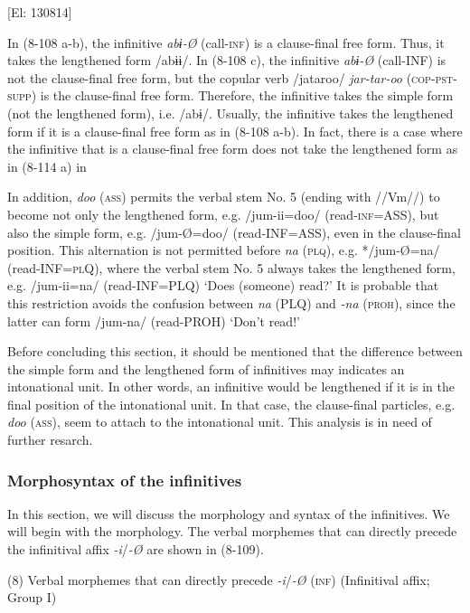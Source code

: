       [El: 130814]

In (8-108 a-b), the infinitive \textit{abɨ-Ø} (call-\textsc{inf}) is a clause-final free form. Thus, it takes the lengthened form /abɨɨ/. In (8-108 c), the infinitive \textit{abɨ-Ø} (call-INF) is not the clause-final free form, but the copular verb /jataroo/ \textit{jar-tar-oo} (\textsc{cop}-\textsc{pst}-\textsc{supp}) is the clause-final free form. Therefore, the infinitive takes the simple form (not the lengthened form), i.e. /abɨ/. Usually, the infinitive takes the lengthened form if it is a clause-final free form as in (8-108 a-b). In fact, there is a case where the infinitive that is a clause-final free form does not take the lengthened form as in (8-114 a) in 

  In addition, \textit{doo} (\textsc{ass}) permits the verbal stem No. 5 (ending with //Vm//) to become not only the lengthened form, e.g. /jum-ii=doo/ (read-\textsc{inf}=ASS), but also the simple form, e.g. /jum-Ø=doo/ (read-INF=ASS), even in the clause-final position. This alternation is not permitted before \textit{na} (\textsc{plq}), e.g. */jum-Ø=na/ (read-INF=\textsc{pl}Q), where the verbal stem No. 5 always takes the lengthened form, e.g. /jum-ii=na/ (read-INF=PLQ) ‘Does (someone) read?’ It is probable that this restriction avoids the confusion between \textit{na} (PLQ) and \textit{{}-na} (\textsc{proh}), since the latter can form /jum-na/ (read-PROH) ‘Don’t read!’

  Before concluding this section, it should be mentioned that the difference between the simple form and the lengthened form of infinitives may indicates an intonational unit. In other words, an infinitive would be lengthened if it is in the final position of the intonational unit. In that case, the clause-final particles, e.g. \textit{doo} (\textsc{ass}), seem to attach to the intonational unit. This analysis is in need of further resarch.

\subsubsection{Morphosyntax of the infinitives}

In this section, we will discuss the morphology and syntax of the infinitives. We will begin with the morphology. The verbal morphemes that can directly precede the infinitival affix \textit{{}-i}/\textit{{}-Ø} are shown in (8-109).

(8)  Verbal morphemes that can directly precede \textit{{}-i}/\textit{{}-Ø} (\textsc{inf}) (Infinitival affix; Group I)

